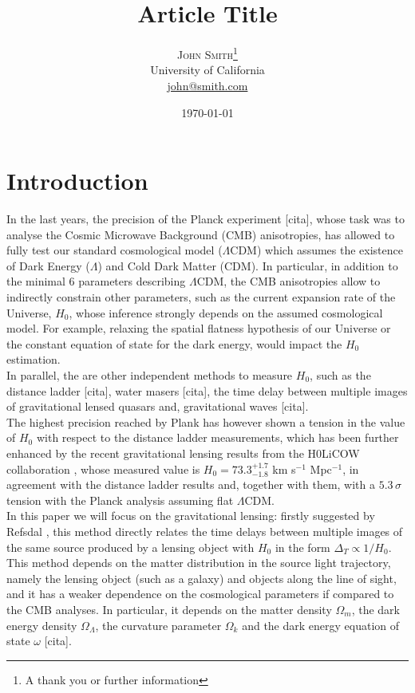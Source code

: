 \documentclass[twoside,twocolumn]{article}
\title{Article Title} %
\author{%
\textsc{John Smith}\thanks{A thank you or further information} \\[1ex] %
\normalsize University of California \\ %
\normalsize \href{mailto:john@smith.com}{john@smith.com} %
}
\date{\today} %
\begin{document}
\maketitle


\section{Introduction}
In the last years, the precision of the Planck experiment [cita], whose task was to analyse the Cosmic Microwave Background (CMB) anisotropies, has allowed to fully test our standard cosmological model ($\Lambda$CDM) which assumes the existence of Dark Energy ($\Lambda$) and Cold Dark Matter (CDM). In particular, in addition to the minimal 6 parameters describing $\Lambda$CDM, the CMB anisotropies allow to indirectly constrain other parameters, such as the current expansion rate of the Universe, $H_0$, whose inference strongly depends on the assumed cosmological model. For example, relaxing the spatial flatness hypothesis of our Universe or the constant equation of state for the dark energy, would impact the $H_0$ estimation.
\\
In parallel, the are other independent methods to measure $H_0$, such as the distance ladder [cita], water masers [cita], the time delay between multiple images of gravitational lensed quasars \cite{H0licow_I} and, gravitational waves [cita]. 
\\
The highest precision reached by Plank has however shown a tension in the value of $H_0$ with respect to the distance ladder measurements, which has been further enhanced by the recent gravitational lensing results from the H0LiCOW collaboration \cite{H0licow_XIII}, whose measured value is $H_0=73.3^{+1.7}_{-1.8}$ km s$^{-1}$ Mpc$^{-1}$, in agreement with the distance ladder results and, together with them, with a $5.3 \, \sigma$ tension with the Planck analysis assuming flat $\Lambda$CDM.
\\
In this paper we will focus on the gravitational lensing: firstly suggested by Refsdal \cite{Refsdal1964}, this method directly relates the time delays between multiple images of the same source produced by a lensing object with $H_0$ in the form $\Delta_T \propto 1/H_0$. This method depends on the matter distribution in the source light trajectory, namely the lensing object (such as a galaxy) and objects along the line of sight, and it has a weaker dependence on the cosmological parameters if compared to the CMB analyses. In particular, it depends on the matter density $\Omega_m$, the dark energy density $\Omega_\Lambda$, the curvature parameter $\Omega_k$ and the dark energy equation of state $\omega$ [cita].
\end{document}
